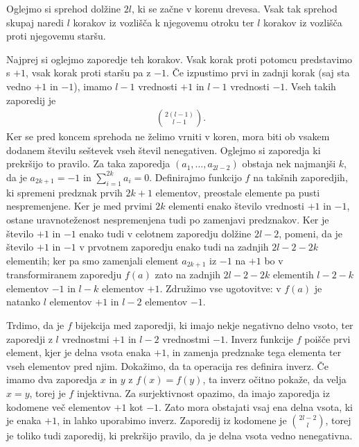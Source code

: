 \begin{dokaz}
    Oglejmo si sprehod dolžine \(2l\), ki se začne v korenu drevesa. Vsak tak sprehod skupaj naredi \(l\) korakov iz vozlišča k njegovemu otroku ter \(l\) korakov iz vozlišča proti njegovemu staršu. 
    
    Najprej si oglejmo zaporedje teh korakov. Vsak korak proti potomcu predstavimo s \(+1\), vsak korak proti staršu pa z \(-1\). Če izpustimo prvi in zadnji korak (saj sta vedno \(+1\) in \(-1\)), imamo \(l-1\) vrednosti \(+1\) in \(l-1\) vrednosti \(-1\). Vseh takih zaporedij je
    \begin{align*}
        \binom{2(l-1)}{l-1}.
    \end{align*}
    Ker se pred koncem sprehoda ne želimo vrniti v koren, mora biti ob vsakem dodanem številu seštevek vseh števil nenegativen. Oglejmo si zaporedja ki prekršijo to pravilo. Za taka zaporedja \((a_1, \ldots, a_{2l-2})\) obstaja nek najmanjši \(k\), da je \(a_{2k+1}=-1\) in \(\sum_{i=1}^{2k} a_i = 0\). Definirajmo funkcijo \(f\) na takšnih zaporedjih, ki spremeni predznak prvih \(2k+1\) elementov, preostale elemente pa pusti nespremenjene. Ker je med prvimi \(2k\) elementi enako število vrednosti \(+1\) in \(-1\), ostane uravnoteženost nespremenjena tudi po zamenjavi predznakov. Ker je število \(+1\) in \(-1\) enako tudi v celotnem zaporedju dolžine \(2l-2\), pomeni, da je število \(+1\) in \(-1\) v prvotnem zaporedju enako tudi na zadnjih \(2l-2-2k\) elementih; ker pa smo zamenjali element \(a_{2k+1}\) iz \(-1\) na \(+1\) bo v transformiranem zaporedju \(f(a)\) zato na zadnjih \(2l-2-2k\) elementih \(l-2-k\) elementov \(-1\) in \(l-k\) elementov \(+1\). Združimo vse ugotovitve: v \(f(a)\) je natanko \(l\) elementov \(+1\) in \(l-2\) elementov \(-1\). 
    
    Trdimo, da je \(f\) bijekcija med zaporedji, ki imajo nekje negativno delno vsoto, ter zaporedji z \(l\) vrednostmi \(+1\) in \(l-2\) vrednostmi \(-1\). Inverz funkcije \(f\) poišče prvi element, kjer je delna vsota enaka \(+1\), in zamenja predznake tega elementa ter vseh elementov pred njim. Dokažimo, da ta operacija res definira inverz. Če imamo dva zaporedja \(x\) in \(y\) z \(f(x)=f(y)\), ta inverz očitno pokaže, da velja \(x=y\), torej je \(f\) injektivna. Za surjektivnost opazimo, da imajo zaporedja iz kodomene več elementov \(+1\) kot \(-1\). Zato mora obstajati vsaj ena delna vsota, ki je enaka \(+1\), in lahko uporabimo inverz. Zaporedij iz kodomene je \(\binom{2l-2}{l}\), torej je toliko tudi zaporedij, ki prekršijo pravilo, da je delna vsota vedno nenegativna.
    

\end{dokaz}
